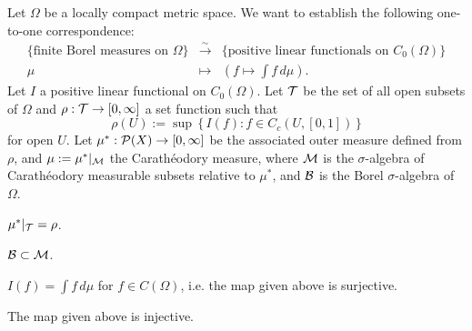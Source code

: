 \documentclass{../../large}
\begin{document}




\begin{prb}
Let $\Omega$ be a locally compact metric space.
We want to establish the following one-to-one correspondence:
\[\begin{array}{ccc}
\{\text{finite Borel measures on $\Omega$}\} & \xrightarrow{\sim} & \{\text{positive linear functionals on $C_0(\Omega)$}\}\\
\mu & \mapsto & (f\mapsto\int f\,d\mu).
\end{array}\]
Let $I$ a positive linear functional on $C_0(\Omega)$.
Let $\mathcal{T}$ be the set of all open subsets of $\Omega$ and $\rho:\mathcal{T}\to[0,\infty]$ a set function such that
\[\rho(U):=\sup\,\{\,I(f):f\in C_c(U,[0,1])\,\}\]
for open $U$.
Let $\mu^*:\mathcal{P}(X)\to[0,\infty]$ be the associated outer measure defined from $\rho$, and $\mu:=\mu^*|_{\mathcal{M}}$ the Carath\'eodory measure, where $\mathcal{M}$ is the $\sigma$-algebra of Carath\'eodory measurable subsets relative to $\mu^*$, and $\mathcal{B}$ is the Borel $\sigma$-algebra of $\Omega$.
\begin{parts}
\item $\mu^*|_{\mathcal{T}}=\rho$.
\item $\mathcal{B}\subset\mathcal{M}$.
\item $I(f)=\int f\,d\mu$ for $f\in C(\Omega)$, i.e. the map given above is surjective.
\item The map given above is injective.
\end{parts}
\end{prb}
\end{document}
